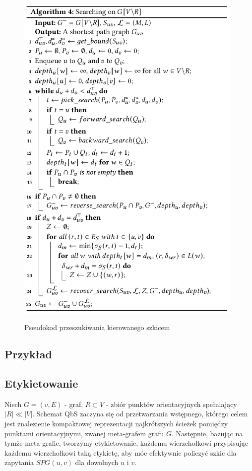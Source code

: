 \documentclass{article}
\theoremstyle{definition}
\begin{document}
    \begin{figure}[!tbh]
        \includegraphics[width=11cm]{img/algorithm_4.png}
        \centering
        \label{fig:alg4}
        \caption{Pseudokod przeszukiwania kierowanego szkicem}
    \end{figure}

    \subsection{Przykład}
     
    \subsection{Etykietowanie}
        Niech $G = (v, E)$ - graf, $R \subset V$ - zbiór punktów orientacyjnych spełniający $|R| \ll |V|$. Schemat QbS zaczyna się od przetwarzania wstępnego, którego celem jest znalezienie kompaktowej reprezentacji najkrótszych ścieżek pomiędzy punktami orientacyjnymi, zwanej meta-grafem grafu $G$. Następnie, bazując na tymże meta-grafie, tworzymy etykietowanie, każdemu wierzchołkowi przypisując każdemu wierzchołkowi taką etykietę, aby móc efektywnie policzyć szkic dla zapytania $SPG(u, v)$  dla dowolnych $u$ i $v$.
\end{document}
